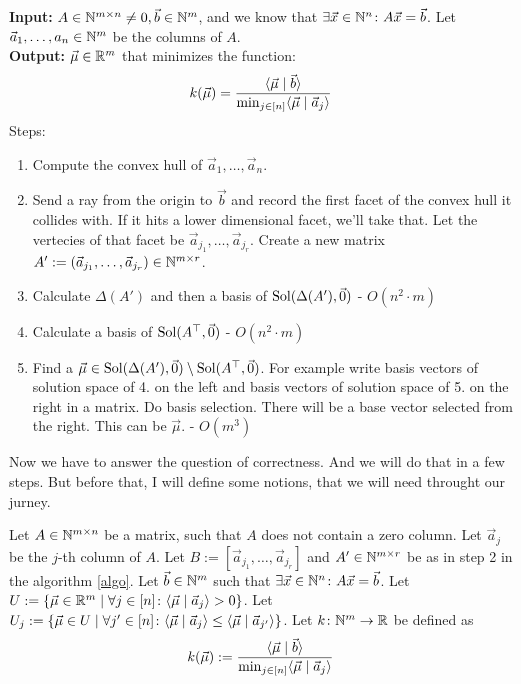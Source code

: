 \begin{algorithm}
    \label{algo}
    \textbf{Input: } $A\in\mathbb{N}^{m\times n} \neq 0, \vec b \in \mathbb{N}^m$, and we know that $\exists \vec x \in \mathbb{N}^n\colon A\vec x = \vec b$. Let $\vec a_1, \dots, a_n\in\mathbb{N}^m$ be the columns of $A$.\\
    \textbf{Output: } $\vec\mu\in\mathbb{R}^m$ that minimizes the function:
    $$k(\vec\mu) = \frac{\langle \vec\mu \mid \vec b \rangle}{\min_{j\in[n]}\langle \vec\mu \mid \vec a_j \rangle}$$
    Steps:
    \begin{enumerate}
        \item Compute the convex hull of $\vec a_1, \dots, \vec a_n$.
        \item Send a ray from the origin to $\vec b$ and record the first facet of the convex hull it collides with. If it hits a lower dimensional facet, we'll take that. Let the vertecies of that facet be $\vec a_{j_1}, \dots, \vec a_{j_r}$. Create a new matrix $A' := (\vec a_{j_1}, \dots, \vec a_{j_r}) \in \mathbb{N}^{m \times r}$.
        \item Calculate $\Delta(A')$ and then a basis of $\operatorname{Sol}(\Delta(A'), \vec0)$ - $O(n^2 \cdot m)$
        \item Calculate a basis of $\operatorname{Sol}(A^\top, \vec0)$ - $O(n^2 \cdot m)$
        \item Find a $\vec\mu \in \operatorname{Sol}(\Delta(A'), \vec0) \setminus \operatorname{Sol}(A^\top, \vec0)$. For example write basis vectors of solution space of 4. on the left and basis vectors of solution space of 5. on the right in a matrix. Do basis selection. There will be a base vector selected from the right. This can be $\vec\mu$. - $O(m^3)$
    \end{enumerate}
\end{algorithm}
Now we have to answer the question of correctness. And we will do that in a few steps. But before that, I will define some notions, that we will need throught our jurney.
\begin{definition}
    \label{def:algo_basic}
    Let $A \in \mathbb{N}^{m \times n}$ be a matrix, such that $A$ does not contain a zero column. Let $\vec a_j$ be the $j$-th column of $A$. Let $B := [\vec a_{j_1}, \dots, \vec a_{j_r}]$ and $A' \in \mathbb{N}^{m\times r}$ be as in step 2 in the algorithm \ref{algo}. Let $\vec b \in \mathbb{N}^m$ such that $\exists \vec x \in \mathbb{N}^n\colon A\vec x = \vec b$. Let $U := \{\vec\mu \in \mathbb{R}^m\mid \forall j \in [n]\colon\langle \vec\mu \mid \vec a_j \rangle > 0\}$. Let $U_j := \{\vec\mu \in U \mid \forall j'\in[n]\colon \langle \vec\mu \mid \vec a_j \rangle \leq \langle \vec\mu \mid \vec a_{j'} \rangle\}$. Let $k\colon \mathbb{N}^m\to\mathbb{R}$ be defined as 
    $$k(\vec\mu) := \frac{\langle \vec\mu \mid \vec b \rangle}{\min_{j\in[n]}\langle \vec\mu \mid \vec a_j \rangle}$$
\end{definition}

